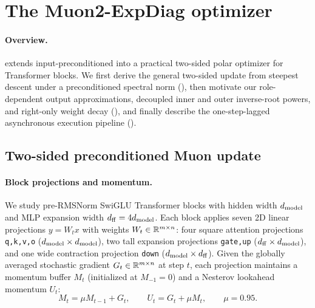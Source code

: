 \section{The Muon2-ExpDiag optimizer}
\label{sec:method}

\paragraph{Overview.}
 extends input-preconditioned  into a practical two-sided polar optimizer for Transformer blocks. We first derive the general two-sided update from steepest descent under a preconditioned spectral norm (), then motivate our role-dependent output approximations, decoupled inner and outer inverse-root powers, and right-only weight decay (), and finally describe the one-step-lagged asynchronous execution pipeline ().

\subsection{Two-sided preconditioned Muon update}
\label{sec:operator}

\paragraph{Block projections and momentum.}
We study pre-RMSNorm SwiGLU Transformer blocks with hidden width $d_{\mathrm{model}}$ and MLP expansion width $d_{\mathrm{ff}}=4d_{\mathrm{model}}$. Each block applies seven 2D linear projections $y=W_t x$ with weights $W_t\in\mathbb{R}^{m\times n}$: four square attention projections \texttt{q,k,v,o} ($d_{\mathrm{model}}\times d_{\mathrm{model}}$), two tall expansion projections \texttt{gate,up} ($d_{\mathrm{ff}}\times d_{\mathrm{model}}$), and one wide contraction projection \texttt{down} ($d_{\mathrm{model}}\times d_{\mathrm{ff}}$). Given the globally averaged stochastic gradient $G_t\in\mathbb{R}^{m\times n}$ at step $t$, each projection maintains a momentum buffer $M_t$ (initialized at $M_{-1}=0$) and a Nesterov lookahead momentum $U_t$:
\begin{equation}
 M_t=\mu M_{t-1}+G_t,\qquad U_t=G_t+\mu M_t,\qquad\mu=0.95.
 \label{eq:momentum}
\end{equation}

